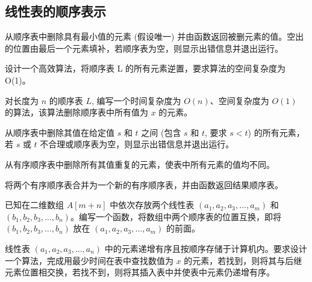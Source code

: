 \subsection{线性表的顺序表示}

\begin{qitems}

    \begin{bbox}
        \qitem 从顺序表中删除具有最小值的元素 (假设唯一) 并由函数返回被删元素的值。空出的位置由最后一个元素填补，若顺序表为空，则显示出错信息并退出运行。
    \end{bbox}

    \begin{bbox}
        \qitem 设计一个高效算法，将顺序表 L 的所有元素逆置，要求算法的空间复杂度为 O(1)。
    \end{bbox}

    \begin{bbox}
        \qitem 对长度为 $n$ 的顺序表 $L$, 编写一个时间复杂度为 $O(n)$、空间复杂度为 $O(1)$ 的算法，该算法删除顺序表中所有值为 $x$ 的元素。
    \end{bbox}

    \begin{bbox}
        \qitem 从顺序表中删除其值在给定值 $s$ 和 $t$ 之间 (包含 $s$ 和 $t$, 要求 $s<t$) 的所有元素，若 $s$ 或 $t$ 不合理或顺序表为空，则显示出错信息并退出运行。
    \end{bbox}

    \begin{bbox}
        \qitem 从有序顺序表中删除所有其值重复的元素，使表中所有元素的值均不同。
    \end{bbox}

    \begin{bbox}
        \qitem 将两个有序顺序表合并为一个新的有序顺序表，并由函数返回结果顺序表。
    \end{bbox}

    \begin{bbox}
        \qitem 已知在二维数组 $A[m+n]$ 中依次存放两个线性表 $(a_1,a_2,a_3,\dots,a_m)$ 和 $(b_1,b_2,b_3,\dots,b_n)$。编写一个函数，将数组中两个顺序表的位置互换，即将 $(b_1,b_2,b_3,\dots,b_n)$ 放在 $(a_1,a_2,a_3,\dots,a_m)$ 的前面。
    \end{bbox}

    \begin{bbox}
        \qitem 线性表 $(a_1,a_2,a_3,\dots,a_n)$ 中的元素递增有序且按顺序存储于计算机内。要求设计一个算法，完成用最少时间在表中查找数值为 $x$ 的元素，若找到，则将其与后继元素位置相交换，若找不到，则将其插入表中并使表中元素仍递增有序。
    \end{bbox}


\end{qitems}
